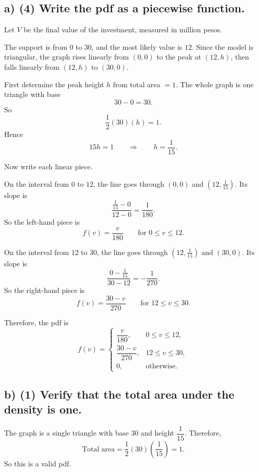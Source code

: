 	\subsection*{a) \textbf{(4)} Write the pdf as a piecewise function.}
	\label{subsec:small-business-investment-c3-a}
	Let $V$ be the final value of the investment, measured in million pesos.
	
	The support is from $0$ to $30$, and the most likely value is $12$. Since the model is triangular, the graph rises linearly from $(0,0)$ to the peak at $(12,h)$, then falls linearly from $(12,h)$ to $(30,0)$.
	
	First determine the peak height $h$ from total area $=1$. The whole graph is one triangle with base
	\[
	30-0=30.
	\]
	So
	\[
	\frac12(30)(h)=1.
	\]
	Hence
	\[
	15h=1
	\qquad \Rightarrow \qquad
	h=\frac{1}{15}.
	\]
	
	Now write each linear piece.
	
	On the interval from $0$ to $12$, the line goes through $(0,0)$ and $(12,\tfrac{1}{15})$. Its slope is
	\[
	\frac{\tfrac{1}{15}-0}{12-0}=\frac{1}{180}.
	\]
	So the left-hand piece is
	\[
	f(v)=\frac{v}{180}\qquad \text{for }0\le v\le 12.
	\]
	
	On the interval from $12$ to $30$, the line goes through $(12,\tfrac{1}{15})$ and $(30,0)$. Its slope is
	\[
	\frac{0-\tfrac{1}{15}}{30-12}=-\frac{1}{270}.
	\]
	So the right-hand piece is
	\[
	f(v)=\frac{30-v}{270}\qquad \text{for }12\le v\le 30.
	\]
	
	Therefore, the pdf is
	\[
	f(v)=
	\begin{cases}
		\dfrac{v}{180}, & 0\le v\le 12,\\[6pt]
		\dfrac{30-v}{270}, & 12\le v\le 30,\\[6pt]
		0, & \text{otherwise.}
	\end{cases}
	\]
	
	
	\subsection*{b) \textbf{(1)} Verify that the total area under the density is one.}
	\label{subsec:small-business-investment-c3-b}
	The graph is a single triangle with base $30$ and height $\dfrac{1}{15}$. Therefore,
	\[
	\text{Total area}=\frac12(30)\left(\frac{1}{15}\right)=1.
	\]
	So this is a valid pdf.
	
